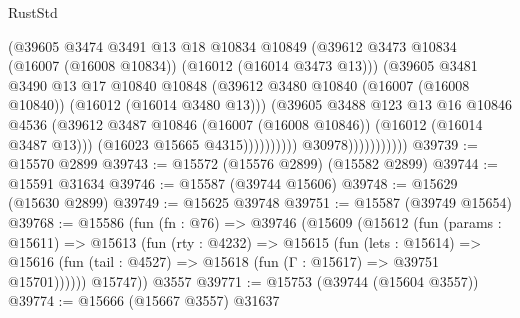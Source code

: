 \begin{lexlean}{RustStd}
\begin{coremodule}
                                      (@39605
                                        @3474
                                        @3491
                                        @13
                                        @18
                                        @10834
                                        @10849
                                        (@39612
                                          @3473
                                          @10834
                                          (@16007 (@16008 @10834))
                                          (@16012 (@16014 @3473 @13)))
                                        (@39605
                                          @3481
                                          @3490
                                          @13
                                          @17
                                          @10840
                                          @10848
                                          (@39612
                                            @3480
                                            @10840
                                            (@16007 (@16008 @10840))
                                            (@16012 (@16014 @3480 @13)))
                                          (@39605
                                            @3488
                                            @123
                                            @13
                                            @16
                                            @10846
                                            @4536
                                            (@39612
                                              @3487
                                              @10846
                                              (@16007 (@16008 @10846))
                                              (@16012 (@16014 @3487 @13)))
                                            (@16023 @15665 @4315))))))))))
                          @30978)))))))))))
@39739 := @15570 @2899
@39743 := @15572 (@15576 @2899) (@15582 @2899)
@39744 := @15591 @31634
@39746 := @15587 (@39744 @15606)
@39748 := @15629 (@15630 @2899)
@39749 := @15625 @39748
@39751 := @15587 (@39749 @15654)
@39768 := @15586
    (fun (fn : @76) =>
    @39746
      (@15609
        (@15612
          (fun (params : @15611) =>
          @15613
            (fun (rty : @4232) =>
            @15615
              (fun (lets : @15614) =>
              @15616 (fun (tail : @4527) => @15618 (fun (Γ : @15617) => @39751 @15701))))))
        @15747))
    @3557
@39771 := @15753 (@39744 (@15604 @3557))
@39774 := @15666 (@15667 @3557) @31637

\end{coremodule}
\end{lexlean}
